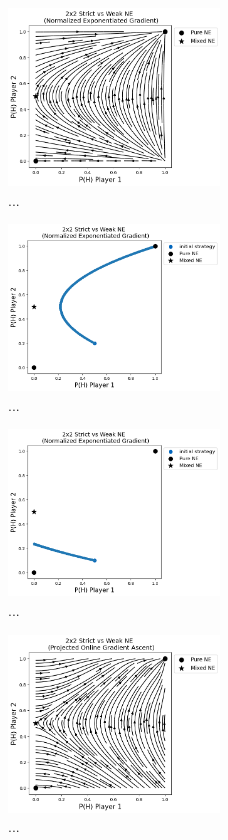 \begin{figure}
    \centering
    \includegraphics[width=0.5\textwidth]{logos/Weak2.png}
    \caption{...}
    \label{Weak2}
\end{figure}

\begin{figure}
    \centering
    \includegraphics[width=0.5\textwidth]{logos/Weak3.png}
    \caption{...}
    \label{Weak3}
\end{figure}

\begin{figure}
    \centering
    \includegraphics[width=0.5\textwidth]{logos/Weak4.png}
    \caption{...}
    \label{Weak4}
\end{figure}

\begin{figure}
    \centering
    \includegraphics[width=0.5\textwidth]{logos/Weak5.png}
    \caption{...}
    \label{Weak5}
\end{figure}

